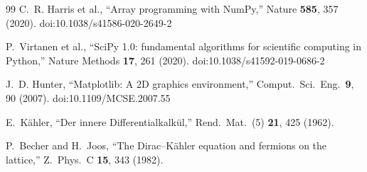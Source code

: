 \documentclass[12pt]{article}
\begin{document}
\begin{thebibliography}{99}
C.~R. Harris et al., ``Array programming with NumPy,'' Nature \textbf{585}, 357 (2020).  doi:10.1038/s41586-020-2649-2  %

P.~Virtanen et al., ``SciPy 1.0: fundamental algorithms for scientific computing in Python,'' Nature Methods \textbf{17}, 261 (2020).  doi:10.1038/s41592-019-0686-2

J.~D. Hunter, ``Matplotlib: A 2D graphics environment,'' Comput.\ Sci.\ Eng.\ \textbf{9}, 90 (2007).  doi:10.1109/MCSE.2007.55

E.~K\"ahler, ``Der innere Differentialkalk\"ul,'' Rend.\ Mat.\ (5) \textbf{21}, 425 (1962).  %

P.~Becher and H.~Joos, ``The Dirac--K\"ahler equation and fermions on the lattice,'' Z.\ Phys.\ C \textbf{15}, 343 (1982).  %

\end{thebibliography}
\end{document}
